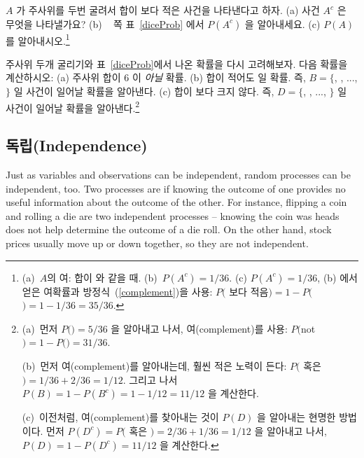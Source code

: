 \begin{exercise}

$A$ 가 주사위를 두번 굴려서 합이  보다 적은 사건을 나타낸다고 하자. (a) 사건 $A^c$ 은 무엇을 나타낼가요? (b) ~\pageref{diceProb} 쪽 표~\ref{diceProb} 에서 $P(A^c)$ 을 알아내세요. (c) $P(A)$ 를 알아내시오.\footnote{(a)~$A$의 여: 합이  와 같을 때. (b)~$P(A^c) = 1/36$. (c) $P(A^c) = 1/36$, (b) 에서 얻은 여확률과  방정식~(\ref{complement})을 사용: $P($  보다 적음$) = 1 - P($$) = 1 - 1/36 = 35/36$.}
\end{exercise}

\begin{exercise} 주사위 두개 굴리기와 표~\ref{diceProb}에서 나온 확률을 다시 고려해보자. 다음 확률을 계산하시오: (a) 주사위 합이 6 이 \emph{아닐} 확률. (b) 합이 적어도  일 확률. 즉, 
$B=\{$, , ..., $\}$ 일 사건이 일어날 확률을 알아낸다. (c) 합이  보다 크지 않다. 즉, $D=\{$, , ..., $\}$ 일 사건이 일어날 확률을 알아낸다.\footnote{(a)~먼저 $P($$)=5/36$ 을 알아내고 나서, 여(complement)를 사용: $P($not $) = 1 - P($$) = 31/36$.

(b)~먼저 여(complement)를 알아내는데, 훨씬 적은 노력이 든다: $P($ 혹은 $)=1/36+2/36=1/12$. 그리고 나서 $P(B) = 1-P(B^c) = 1-1/12 = 11/12$ 을 계산한다.

(c)~이전처럼, 여(complement)를 찾아내는 것이 $P(D)$ 을 알아내는 현명한 방법이다. 먼저 $P(D^c) = P($ 혹은 $)=2/36 + 1/36=1/12$ 을 알아내고 나서, $P(D) = 1 - P(D^c) = 11/12$ 을 계산한다.}
\end{exercise}


\subsection{독립(Independence)}
\label{probabilityIndependence}

Just as variables and observations can be independent, random processes can be independent, too. Two processes are  if knowing the outcome of one provides no useful information about the outcome of the other. For instance, flipping a coin and rolling a die are two independent processes -- knowing the coin was heads does not help determine the outcome of a die roll. On the other hand, stock prices usually move up or down together, so they are not independent.

